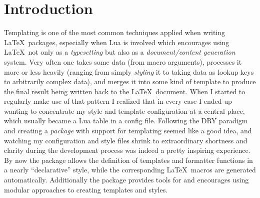 \documentclass{scrartcl}
\title{\package{luatemplates}}
\subtitle{v0.8}
\author{Urs Liska}
\date{\today}
\begin{document}
\maketitle

\begin{abstract}

 is a package for Lua\LaTeX\ designed to assist package
and document authors with the recurring task of \emph{templating}.  Essentially
it eliminates the need to deal with the interfacing of the \LaTeX\ and Lua sides
of creating macros.  The package's main objectives are: maintaining  templates
and formatter functions in a central location, easily exposing them as \LaTeX\
macros, and assisting with a modular style of programming templates and styles.

\end{abstract}

\tableofcontents

\section{Introduction}

Templating is one of the most common techniques applied when writing \LaTeX\
packages, especially when Lua is involved which encourages using \LaTeX\ not
only as a \emph{typesetting} but also as a \emph{document/content generation}
system.  Very often one takes some data (from macro arguments), processes it
more or less heavily (ranging from simply \emph{styling} it to taking data as
lookup keys to arbitrarily complex data), and merges it into some kind of
template to produce the final result being written back to the \LaTeX\ document.
When I started to regularly make use of that pattern I realized that in every
case I ended up wanting to concentrate my style and template configuration at a
central place, which usually became a Lua table in a config file.  Following the
DRY paradigm and creating a \emph{package} with support for templating seemed
like a good idea, and watching my configuration and style files shrink to
extraordinary shortness and clarity during the development process was indeed a
pretty inspiring experience.  By now the package allows the definition of
templates and formatter functions in a nearly “declarative” style, while the
corresponding \LaTeX\ macros are generated automatically. Additionally the
package provides tools for and encourages using modular approaches to creating
templates and styles.
\end{document}
